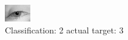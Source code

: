 \begin{figure}[h!]
\begin{center}
\includegraphics[width=0.60\columnwidth]{figures/ID2874_class_2_target_3.png}
\end{center}
\caption{ Classification: 2 actual target: 3}
\label{fig:ID2874_class_2_target_3}
\end{figure}
